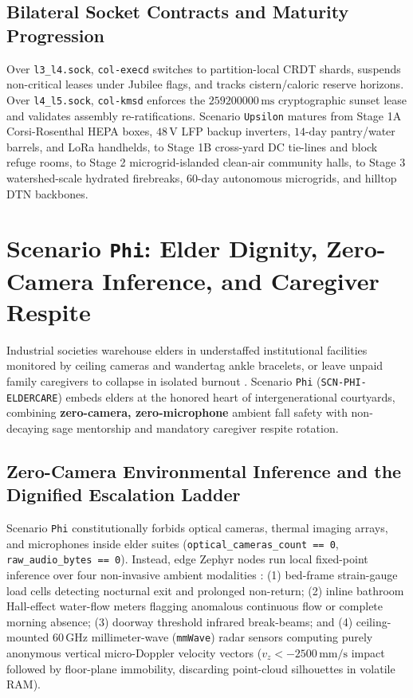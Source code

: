 \subsection{Bilateral Socket Contracts and Maturity Progression}

Over \texttt{l3\_l4.sock}, \texttt{col-execd} switches to partition-local CRDT shards, suspends non-critical leases under Jubilee flags, and tracks
cistern/caloric reserve horizons. Over \texttt{l4\_l5.sock}, \texttt{col-kmsd} enforces the $259200000\,\mathrm{ms}$ cryptographic sunset lease and
validates assembly re-ratifications. Scenario \texttt{Upsilon} matures from Stage 1A Corsi-Rosenthal HEPA boxes, $48\,\mathrm{V}$ LFP backup inverters,
$14\text{-day}$ pantry/water barrels, and LoRa handhelds, to Stage 1B cross-yard DC tie-lines and block refuge rooms, to Stage 2 microgrid-islanded
clean-air community halls, to Stage 3 watershed-scale hydrated firebreaks, $60\text{-day}$ autonomous microgrids, and hilltop DTN backbones.

\section{Scenario \texttt{Phi}: Elder Dignity, Zero-Camera Inference, and Caregiver Respite}
\label{sec:scn-phi}

Industrial societies warehouse elders in understaffed institutional facilities monitored by ceiling cameras and wandertag ankle bracelets, or leave
unpaid family caregivers to collapse in isolated burnout \parencite{illich1973,han2015}. Scenario \texttt{Phi} (\texttt{SCN-PHI-ELDERCARE}) embeds
elders at the honored heart of intergenerational courtyards, combining \textbf{zero-camera, zero-microphone} ambient fall safety with non-decaying sage
mentorship and mandatory caregiver respite rotation.

\subsection{Zero-Camera Environmental Inference and the Dignified Escalation Ladder}

Scenario \texttt{Phi} constitutionally forbids optical cameras, thermal imaging arrays, and microphones inside elder suites
(\texttt{optical\_cameras\_count == 0}, \texttt{raw\_audio\_bytes == 0}). Instead, edge Zephyr nodes run local fixed-point inference over four
non-invasive ambient modalities \parencite{weiser1996calm}: (1) bed-frame strain-gauge load cells detecting nocturnal exit and prolonged non-return; (2)
inline bathroom Hall-effect water-flow meters flagging anomalous continuous flow or complete morning absence; (3) doorway threshold infrared
break-beams; and (4) ceiling-mounted $60\,\mathrm{GHz}$ millimeter-wave (\texttt{mmWave}) radar sensors computing purely anonymous vertical
micro-Doppler velocity vectors ($v_z < -2500\,\mathrm{mm/s}$ impact followed by floor-plane immobility, discarding point-cloud silhouettes in volatile
RAM).

